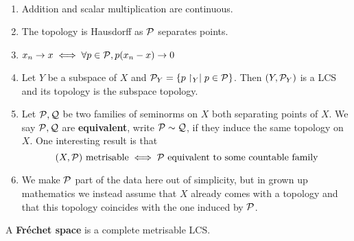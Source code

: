 \documentclass{article}
\begin{document}
\begin{rmks}~

  \begin{enumerate}
    \item Addition and scalar multiplication are continuous.
    \item The topology is Hausdorff as $\mathcal P$ separates points.
    \item $x_n \to x \iff \forall p \in \mathcal P, p(x_n - x) \to 0$
    \item Let $Y$ be a subspace of $X$ and $\mathcal P_Y = \{p\restriction_Y \mid p \in \mathcal P\}$. Then $(Y, \mathcal P_Y)$ is a LCS and its topology is the subspace topology.
    \item Let $\mathcal P, \mathcal Q$ be two families of seminorms on $X$ both separating points of $X$. We say $\mathcal P, \mathcal Q$ are {\bf equivalent}, write $\mathcal P \sim \mathcal Q$, if they induce the same topology on $X$. One interesting result is that
    $$ (X, \mathcal P) \text{ metrisable} \iff \mathcal P \text{ equivalent to some countable family}$$
    \item We make $\mathcal P$ part of the data here out of simplicity, but in grown up mathematics we instead assume that $X$ already comes with a topology and that this topology coincides with the one induced by $\mathcal P$.
  \end{enumerate}
\end{rmks}

\begin{dfn*}
  A {\bf Fréchet space} is a complete metrisable LCS.
\end{dfn*}
\end{document}
